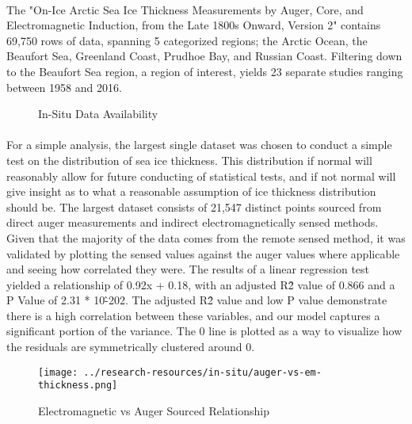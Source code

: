 \paragraph*{}
The "On-Ice Arctic Sea Ice Thickness Measurements by Auger, Core, and Electromagnetic Induction, from the Late 1800s Onward, Version 2" contains 69,750 rows of data, spanning 5 categorized regions; the Arctic Ocean, the Beaufort Sea, Greenland Coast, Prudhoe Bay, and Russian Coast. Filtering down to the Beaufort Sea region, a region of interest, yields 23 separate studies ranging between 1958 and 2016.
\par
\begin{figure}[htb]
	\centering
	\caption{In-Situ Data Availability}
	\label{fig:foobar}
\end{figure}


\paragraph*{}
For a simple analysis, the largest single dataset was chosen to conduct a simple test on the distribution of sea ice thickness. This distribution if normal will reasonably allow for future conducting of statistical tests, and if not normal will give insight as to what a reasonable assumption of ice thickness distribution should be. The largest dataset consists of 21,547 distinct points sourced from direct auger measurements and indirect electromagnetically sensed methods. Given that the majority of the data comes from the remote sensed method, it was validated by plotting the sensed values against the auger values where applicable and seeing how correlated they were. The results of a linear regression test yielded a relationship of 0.92x + 0.18, with an adjusted R\^2 value of 0.866 and a P Value of 2.31 * 10\^-202. The adjusted R\^2 value and low P value demonstrate there is a high correlation between these variables, and our model captures a significant portion of the variance. The 0 line is plotted as a way to visualize how the residuals are symmetrically clustered around 0.
\par

\begin{figure}[htb]
	\centering
	\texttt{[image: ../research-resources/in-situ/auger-vs-em-thickness.png]}
	\caption{Electromagnetic vs Auger Sourced Relationship}
	\label{fig:aug-vs-em}
\end{figure}

